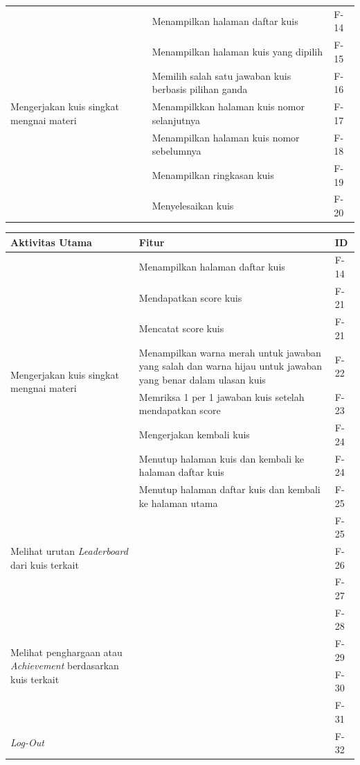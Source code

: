 \begin{table}[H]
\begin{tabular}{|m{3cm}|p{}|m{1.5cm}|}
		\hline
		\multirow{7}{2.5cm}{Mengerjakan kuis singkat mengnai materi} &Menampilkan halaman daftar kuis& F-14 \\
		\cline{2-3}
		&Menampilkan halaman kuis yang dipilih& F-15 \\
		\cline{2-3}
		&Memilih salah satu jawaban kuis berbasis pilihan ganda& F-16 \\
		\cline{2-3}
		&Menampilkkan halaman kuis nomor selanjutnya& F-17 \\
		\cline{2-3}
		&Menampilkan halaman kuis nomor sebelumnya& F-18 \\
		\cline{2-3}
		&Menampilkan ringkasan kuis& F-19 \\
		\cline{2-3}
		&Menyelesaikan kuis& F-20 \\
		\hline
	\end{tabular}
\end{table}

\newpage
\begin{table}[H]
	\begin{tabular}{|m{3cm}|p{}|p{1.5cm}|}
		\hline
		\centering\textbf{Aktivitas Utama} & \centering\textbf{Fitur} & \multicolumn{1}{m{1.5cm}|}{\centering \textbf{ID}} \\
		\hline
		\multirow{8}{2.5cm}{Mengerjakan kuis singkat mengnai materi} &Menampilkan halaman daftar kuis& F-14 \\
		\cline{2-3}
		&Mendapatkan score kuis& F-21 \\
		\cline{2-3}
		&Mencatat score kuis& F-21 \\
		\cline{2-3}
		&Menampilkan warna merah untuk jawaban yang salah dan warna hijau untuk jawaban yang benar dalam ulasan kuis& F-22 \\
		\cline{2-3}
		&Memriksa 1 per 1 jawaban kuis setelah mendapatkan score& F-23 \\
		\cline{2-3}
		&Mengerjakan kembali kuis& F-24 \\
		\cline{2-3}
		&Menutup halaman kuis dan kembali ke halaman daftar kuis& F-24 \\
		\cline{2-3}
		&Menutup halaman daftar kuis dan kembali ke halaman utama& F-25 \\
		\hline
		\multirow{3}{3cm}{Melihat urutan \textit{Leaderboard} dari kuis terkait} & & F-25 \\
		\cline{2-3}
		& & F-26 \\
		\cline{2-3}
		& & F-27 \\
		\hline
		\multirow{4}{3cm}{Melihat penghargaan atau \textit{Achievement} berdasarkan kuis terkait} & & F-28 \\
		\cline{2-3}
		& & F-29 \\
		\cline{2-3}
		& & F-30 \\
		\cline{2-3}
		& & F-31 \\
		\hline
		\multirow{1}{2.5cm}{\textit{Log-Out}} & & F-32 \\
		\hline
	\end{tabular}
\end{table}
